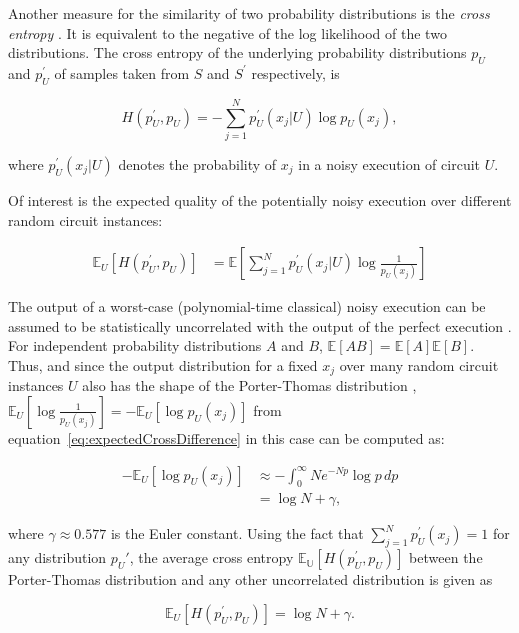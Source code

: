 Another measure for the similarity of two probability distributions is the \textit{cross entropy} \cite{kullback1951}.
It is equivalent to the negative of the log likelihood of the two distributions.
The cross entropy of the underlying
probability distributions $p_U$ and $p_U^{\prime}$ of samples taken from $S$ and $S^{\prime}$ respectively, is

\begin{equation}
  H(p_U^{\prime},p_U) = - \sum_{j=1}^Np_U^{\prime}(x_j|U) \log{p_U(x_j)},
\end{equation}

where $p_U^{\prime}(x_j|U)$ denotes the probability of $x_j$ in a noisy execution of circuit $U$.

Of interest is the expected quality of the potentially noisy execution over
different random circuit instances:

\begin{align}
  \label{eq:expectedCrossDifference}
  \mathbb{E}_U[H(p_U^{\prime},p_U)] &= \mathbb{E} \left[\sum_{j=1}^Np_U^{\prime}(x_j|U)\log{\frac{1}{p_U(x_j)}}\right]
\end{align}

The output of a worst-case (polynomial-time classical) noisy execution can be assumed to
be statistically uncorrelated with the output of the perfect execution \cite{Boixo2018supremacy}. 
For independent probability distributions $A$ and $B$, $\mathbb{E}[AB] = \mathbb{E}[A] \mathbb{E}[B]$. Thus,
and since the output distribution for a fixed $x_j$ over many random circuit
instances $U$ also has the shape of the Porter-Thomas distribution \cite{harrow2008random},
$\mathbb{E}_U[\log{\frac{1}{p_U(x_j)}}] = -\mathbb{E}_U[\log{p_U(x_j)}]$ from equation~\ref{eq:expectedCrossDifference} 
in this case can be computed as:

\begin{align}
  -\mathbb{E}_U[\log{p_U(x_j)}] &\approx - \int_0^{\infty}Ne^{-Np}\log{p} \,dp \\
                                &= \log{N} + \gamma,
\end{align}

where $\gamma \approx 0.577$ is the Euler constant.
Using the fact that $\sum_{j=1}^Np_U^{\prime}(x_j) = 1$ for any distribution $p_U{\prime}$, the average cross
entropy $\mathbb{E_U}[H(p_U^{\prime},p_U)]$ between the Porter-Thomas distribution and any other uncorrelated distribution is
given as 

\begin{equation}
  \mathbb{E}_U [H(p_U^{\prime},p_U)] = \log{N} + \gamma.
\end{equation}

